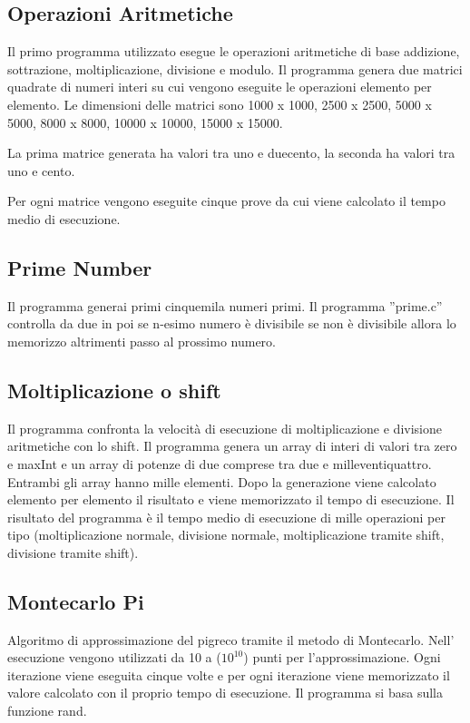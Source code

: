 \documentclass[12pt,a4paper]{report}
\begin{document}
\subsection{Operazioni Aritmetiche}
Il primo programma utilizzato esegue le operazioni aritmetiche di base addizione, sottrazione, moltiplicazione, divisione e modulo.
Il programma genera due matrici quadrate di numeri interi su cui vengono eseguite le operazioni elemento per elemento. Le dimensioni delle matrici sono 1000 x 1000, 2500 x 2500, 5000 x 5000, 8000 x 8000, 10000 x 10000, 15000 x 15000.

La prima matrice generata ha valori tra uno e duecento, la seconda ha valori tra uno e cento.

Per ogni matrice vengono eseguite cinque prove da cui viene calcolato il tempo medio di esecuzione.

\subsection{Prime Number}
Il programma generai primi cinquemila numeri primi. 
Il programma ''prime.c'' controlla da due in poi se n-esimo numero è divisibile se non è divisibile allora lo memorizzo altrimenti passo al prossimo numero.  

\subsection{Moltiplicazione o shift}
Il programma confronta la velocità di esecuzione di moltiplicazione e divisione aritmetiche con lo shift. Il programma genera un array di interi di valori tra zero e maxInt e un array di potenze di due comprese tra due e milleventiquattro. Entrambi gli array hanno mille elementi. Dopo la generazione viene calcolato elemento per elemento il risultato e viene memorizzato il tempo di esecuzione. Il risultato del programma è il tempo medio di esecuzione di mille operazioni per tipo (moltiplicazione normale, divisione normale, moltiplicazione tramite shift, divisione tramite shift).

\subsection{Montecarlo Pi}
Algoritmo di approssimazione del pigreco tramite il metodo di Montecarlo. Nell' esecuzione vengono utilizzati da 10 a ($ 10^{10} $) punti per l'approssimazione. Ogni iterazione viene eseguita cinque volte e per ogni iterazione viene memorizzato il valore calcolato con il proprio tempo di esecuzione. Il programma si basa sulla funzione rand.
\end{document}
